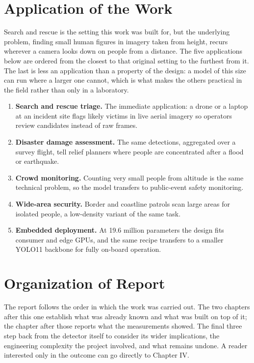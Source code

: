 \documentclass[12pt,a4paper,oneside]{report}
\begin{document}
\section{Application of the Work}

Search and rescue is the setting this work was built for, but the underlying
problem, finding small human figures in imagery taken from height, recurs
wherever a camera looks down on people from a distance. The five applications
below are ordered from the closest to that original setting to the furthest from
it. The last is less an application than a property of the design: a model of
this size can run where a larger one cannot, which is what makes the others
practical in the field rather than only in a laboratory.

\begin{enumerate}
  \item \textbf{Search and rescue triage.} The immediate application: a
        drone or a laptop at an incident site flags likely victims in live
        aerial imagery so operators review candidates instead of raw frames.
  \item \textbf{Disaster damage assessment.} The same detections, aggregated
        over a survey flight, tell relief planners where people are
        concentrated after a flood or earthquake.
  \item \textbf{Crowd monitoring.} Counting very small people from altitude
        is the same technical problem, so the model transfers to public-event
        safety monitoring.
  \item \textbf{Wide-area security.} Border and coastline patrols scan large
        areas for isolated people, a low-density variant of the same task.
  \item \textbf{Embedded deployment.} At 19.6 million parameters the design
        fits consumer and edge GPUs, and the same recipe transfers to a
        smaller YOLO11 backbone for fully on-board operation.
\end{enumerate}

\section{Organization of Report}

The report follows the order in which the work was carried out. The two chapters
after this one establish what was already known and what was built on top of it;
the chapter after those reports what the measurements showed. The final three
step back from the detector itself to consider its wider implications, the
engineering complexity the project involved, and what remains undone. A reader
interested only in the outcome can go directly to Chapter IV.
\end{document}
